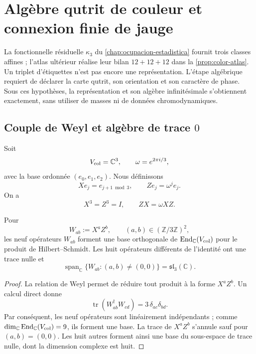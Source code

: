 \chapter{Algèbre qutrit de couleur et connexion finie de jauge}
\label{chap:algebra-color-qutrit}

La fonctionnelle résiduelle \(\kappa_3\) du
\cref{chap:ocupacion-estadistica} fournit trois classes affines ; l'atlas
ultérieur réalise leur bilan \(12+12+12\) dans la
\cref{prop:color-atlas}. Un triplet d'étiquettes n'est pas encore une
représentation. L'étape algébrique requiert de déclarer la carte qutrit, son
orientation et son caractère de phase. Sous ces hypothèses, la représentation et
son algèbre infinitésimale s'obtiennent exactement, sans utiliser de masses ni de données
chromodynamiques.

\section{Couple de Weyl et algèbre de trace \(0\)}
\label{sec:weyl-color-qutrit}

Soit
\[
 V_{\rm col}=\mathbb C^3,
 \qquad
 \omega=e^{2\pi i/3},
\]
avec la base ordonnée \((e_0,e_1,e_2)\). Nous définissons
\[
 Xe_j=e_{j+1\bmod3},
 \qquad
 Ze_j=\omega^j e_j.
\]
On a
\[
 X^3=Z^3=I,
 \qquad
 ZX=\omega XZ.
\]

\begin{theorem}
\label{thm:weyl-sl3-color}
Pour
\[
 W_{ab}:=X^aZ^b,
 \qquad
 (a,b)\in(\mathbb Z/3\mathbb Z)^2,
\]
les neuf opérateurs \(W_{ab}\) forment une base orthogonale de
\(\operatorname{End}_{\mathbb C}(V_{\rm col})\) pour le produit de
Hilbert--Schmidt. Les huit opérateurs différents de l'identité ont une trace nulle et
\[
 \operatorname{span}_{\mathbb C}
 \{W_{ab}:(a,b)\ne(0,0)\}
 =\mathfrak{sl}_3(\mathbb C).
\]
\end{theorem}

\begin{proof}
La relation de Weyl permet de réduire tout produit à la forme
\(X^aZ^b\). Un calcul direct donne
\[
 \operatorname{tr}(W_{ab}^{\dagger}W_{cd})
 =3\,\delta_{ac}\delta_{bd}.
\]
Par conséquent, les neuf opérateurs sont linéairement indépendants ; comme
\(\dim_{\mathbb C}\operatorname{End}_{\mathbb C}(V_{\rm col})=9\), ils forment une
base. La trace de \(X^aZ^b\) s'annule sauf pour
\((a,b)=(0,0)\). Les huit autres forment ainsi une base du sous-espace de
trace nulle, dont la dimension complexe est huit.
\end{proof}

